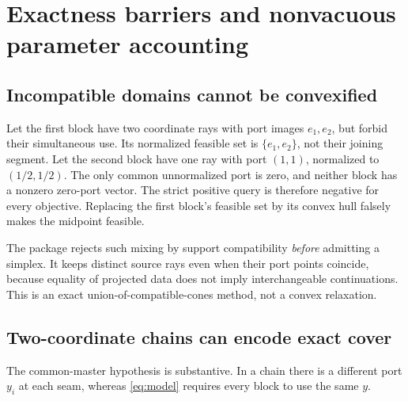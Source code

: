 \section{Exactness barriers and nonvacuous parameter accounting}
\label{sec:barriers}

\subsection{Incompatible domains cannot be convexified}
\begin{example}
\label{ex:convex}
Let the first block have two coordinate rays with port images $e_1,e_2$, but forbid their simultaneous use. Its normalized feasible set is $\{e_1,e_2\}$, not their joining segment. Let the second block have one ray with port $(1,1)$, normalized to $(1/2,1/2)$. The only common unnormalized port is zero, and neither block has a nonzero zero-port vector. The strict positive query is therefore negative for every objective. Replacing the first block's feasible set by its convex hull falsely makes the midpoint feasible.
\end{example}

The package rejects such mixing by support compatibility \emph{before} admitting a simplex. It keeps distinct source rays even when their port points coincide, because equality of projected data does not imply interchangeable continuations. This is an exact union-of-compatible-cones method, not a convex relaxation.

\subsection{Two-coordinate chains can encode exact cover}
The common-master hypothesis is substantive. In a chain there is a different port $y_i$ at each seam, whereas \eqref{eq:model} requires every block to use the same $y$.

